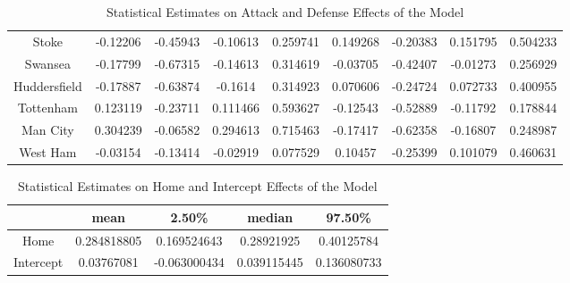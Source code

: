 \documentclass{article}
\begin{document}
\begin{table}[!htb]
\begin{tabular}{c|cccc|cccc}
Stoke                 & -0.12206 & -0.45943 & -0.10613 & 0.259741 & 0.149268 & -0.20383 & 0.151795 & 0.504233 \\
Swansea               & -0.17799 & -0.67315 & -0.14613 & 0.314619 & -0.03705 & -0.42407 & -0.01273 & 0.256929 \\
Huddersfield          & -0.17887 & -0.63874 & -0.1614  & 0.314923 & 0.070606 & -0.24724 & 0.072733 & 0.400955 \\
Tottenham             & 0.123119 & -0.23711 & 0.111466 & 0.593627 & -0.12543 & -0.52889 & -0.11792 & 0.178844 \\
Man City              & 0.304239 & -0.06582 & 0.294613 & 0.715463 & -0.17417 & -0.62358 & -0.16807 & 0.248987 \\
West Ham              & -0.03154 & -0.13414 & -0.02919 & 0.077529 & 0.10457  & -0.25399 & 0.101079 & 0.460631
\end{tabular}
\caption{\label{tab:att_def_stats}Statistical Estimates on Attack and Defense Effects of the Model}
\end{table}

\begin{table}[!htb]
\centering
\begin{tabular}{c|cccc}
          & \textbf{mean} & \textbf{2.50\%} & \textbf{median} & \textbf{97.50\%} \\ \hline
Home      & 0.284818805   & 0.169524643     & 0.28921925      & 0.40125784       \\
Intercept & 0.03767081    & -0.063000434    & 0.039115445     & 0.136080733     
\end{tabular}
\caption{\label{tab:home_intercept_stats}Statistical Estimates on Home and Intercept Effects of the Model}
\end{table}
\end{document}
